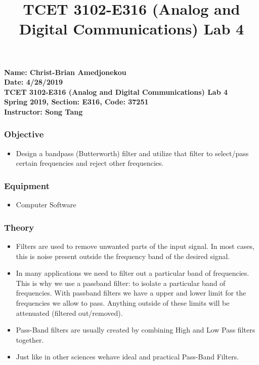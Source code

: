 \documentclass[11pt]{article}
\title{TCET 3102-E316 (Analog and Digital Communications) Lab 4}
\providecommand{\tightlist}{%
      \setlength{\itemsep}{0pt}\setlength{\parskip}{0pt}}
\begin{document}
    
    
    \maketitle
    
    

    
    \textbf{Name: Christ-Brian Amedjonekou}\\
\textbf{Date: 4/28/2019}\\
\textbf{TCET 3102-E316 (Analog and Digital Communications) Lab 4}\\
\textbf{Spring 2019, Section: E316, Code: 37251}\\
\textbf{Instructor: Song Tang}

    \hypertarget{objective}{%
\subsubsection{Objective}\label{objective}}

\begin{itemize}
\tightlist
\item
  Design a bandpass (Butterworth) filter and utilize that filter to
  select/pass certain frequencies and reject other frequencies.
\end{itemize}

\hypertarget{equipment}{%
\subsubsection{Equipment}\label{equipment}}

\begin{itemize}
\tightlist
\item
  Computer Software
\end{itemize}

\hypertarget{theory}{%
\subsubsection{Theory}\label{theory}}

\begin{itemize}
\item
  Filters are used to remove unwanted parts of the input signal. In most
  cases, this is noise present outside the frequency band of the desired
  signal.
\item
  In many applications we need to filter out a particular band of
  frequencies. This is why we use a passband filter: to isolate a
  particular band of frequencies. With passband filters we have a upper
  and lower limit for the frequencies we allow to pass. Anything outside
  of these limits will be attenuated (filtered out/removed).
\item
  Pass-Band filters are usually created by combining High and Low Pass
  filters together.
\item
  Just like in other sciences wehave ideal and practical Pass-Band
  Filters.
\end{itemize}
\end{document}
